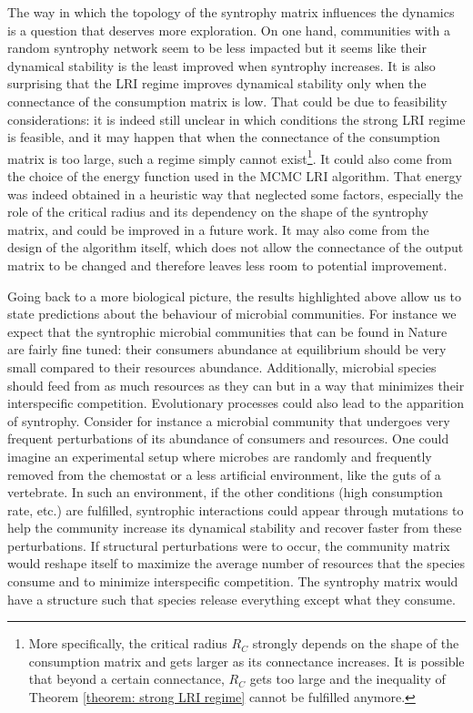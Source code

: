 \documentclass[12pt, titlepage]{report}
\begin{document}
The way in which the topology of the syntrophy matrix influences the dynamics is a question that deserves more exploration. On one hand, communities with a random syntrophy network seem to be less impacted but it seems like their dynamical stability is the least improved when syntrophy increases. It is also surprising that the LRI regime improves dynamical stability only when the connectance of the consumption matrix is low. That could be due to feasibility considerations: it is indeed still unclear in which conditions the strong LRI regime is feasible, and it may happen that when the connectance of the consumption matrix is too large, such a regime simply cannot exist\footnote{More specifically, the critical radius $R_C$ strongly depends on the shape of the consumption matrix and gets larger as its connectance increases. It is possible that beyond a certain connectance, $R_C$ gets too large and the inequality of Theorem \ref{theorem: strong LRI regime} cannot be fulfilled anymore.}. It could also come from the choice of the energy function used in the MCMC LRI algorithm. That energy was indeed obtained in a heuristic way that neglected some factors, especially the role of the critical radius and its dependency on the shape of the syntrophy matrix, and could be improved in a future work. It may also come from the design of the algorithm itself, which does not allow the connectance of the output matrix to be changed and therefore leaves less room to potential improvement.


Going back to a more biological picture, the results highlighted above allow us to state predictions about the behaviour of microbial communities. For instance we expect that the syntrophic microbial communities that can be found in Nature are fairly fine tuned: their consumers abundance at equilibrium should be very small compared to their resources abundance. Additionally, microbial species should feed from as much resources as they can but in a way that minimizes their interspecific competition. Evolutionary processes could also lead to the apparition of syntrophy. Consider for instance a microbial community that undergoes very frequent perturbations of its abundance of consumers and resources. One could imagine an experimental setup where microbes are randomly and frequently removed from the chemostat or a less artificial environment, like the guts of a vertebrate. In such an environment, if the other conditions (high consumption rate, etc.) are fulfilled, syntrophic interactions could appear through mutations to help the community increase its dynamical stability and recover faster from these perturbations. If structural perturbations were to occur, the community matrix would reshape itself to maximize the average number of resources that the species consume and to minimize interspecific competition. The syntrophy matrix would have a structure such that species release everything except what they consume.
\end{document}
